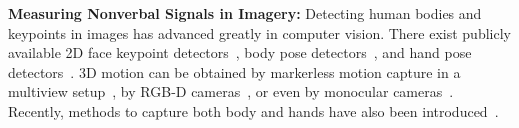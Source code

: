 \textbf{Measuring Nonverbal Signals in Imagery:} Detecting human bodies and keypoints in images has advanced greatly in computer vision. There exist publicly available 2D face keypoint detectors~\cite{baltruvsaitis2016openface}, body pose detectors~\cite{cao2017realtime, Wei2016, Newell-16}, and hand pose detectors~\cite{simon2017hand}. 3D motion can be obtained by markerless motion capture in a multiview setup~\cite{Gall-09,Liu-2013,Elhayek-15, joo2017panoptic, joo2018}, by RGB-D cameras~\cite{Shotton2011,Baak2011}, or even by monocular cameras~\cite{Ramakrishna2012,Bogo2016,martinez2017simple,zhou2017towards,Moreno-noguer2017,mehta2017monocular}. Recently, methods to capture both body and hands have also been introduced~\cite{MANO:SIGGRAPHASIA:2017,joo2018}. 


%

%




